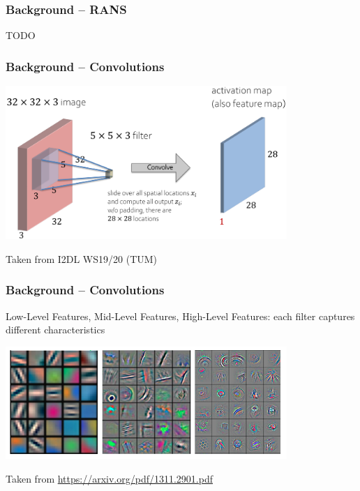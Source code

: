 \begin{frame}
    \frametitle{Background -- RANS}
 TODO
\end{frame}
\clearpage

\begin{frame}
    \frametitle{Background -- Convolutions}
\vspace*{5mm}
\includegraphics[width=0.8\textwidth, height=.55\textheight]{./Ressourcen/Praesentation/Bilder/conv_bsp.png}%

Taken from I2DL WS19/20 (TUM)
    
\end{frame}
\clearpage

\begin{frame}
    \frametitle{Background -- Convolutions}

Low-Level Features, Mid-Level Features, High-Level Features: each filter captures different characteristics

\includegraphics[width=0.8\textwidth, height=.55\textheight]{./Ressourcen/Praesentation/Bilder/features.png}%
\vspace*{-5mm}

Taken from \url{https://arxiv.org/pdf/1311.2901.pdf}   
    
\end{frame}
\clearpage